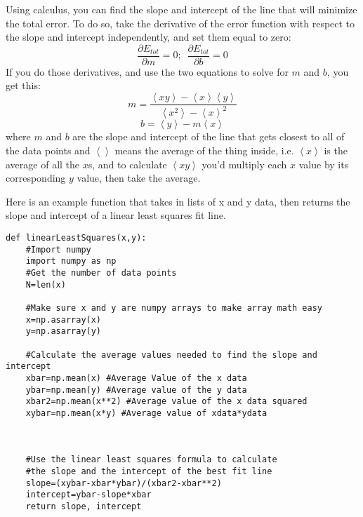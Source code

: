 Using calculus, you can find the slope and intercept of the line that will minimize the total error.  To do so, take the derivative of the error function with respect to the slope and intercept independently, and set them equal to zero:
\[\frac{\partial E_{tot}}{\partial m}=0;\,\,\,\frac{\partial E_{tot}}{\partial b}=0\]
If you do those derivatives, and use the two equations to solve for $m$ and $b$, you get this:
\[m=\frac{\left<xy\right>-\left<x\right>\left<y\right>}{\left<x^2\right>-\left<x\right>^2}\]
\[b=\left<y\right>-m\left<x\right>\]
where $m$ and $b$ are the slope and intercept of the line that gets closest to all of the data points and $\left<\right>$ means the average of the thing inside, i.e. $\left<x\right>$ is the average of all the $x$s, and to calculate $\left<xy\right>$ you'd multiply each $x$ value by its corresponding $y$ value, then take the average.

Here is an example function that takes in lists of x and y data, then returns the slope and intercept of a linear least squares fit line.
\begin{Verbatim}
def linearLeastSquares(x,y):
    #Import numpy
    import numpy as np
    #Get the number of data points
    N=len(x)

    #Make sure x and y are numpy arrays to make array math easy
    x=np.asarray(x)
    y=np.asarray(y)

    #Calculate the average values needed to find the slope and intercept
    xbar=np.mean(x) #Average Value of the x data
    ybar=np.mean(y) #Average value of the y data
    xbar2=np.mean(x**2) #Average value of the x data squared
    xybar=np.mean(x*y) #Average value of xdata*ydata



    #Use the linear least squares formula to calculate
    #the slope and the intercept of the best fit line
    slope=(xybar-xbar*ybar)/(xbar2-xbar**2)
    intercept=ybar-slope*xbar
    return slope, intercept

\end{Verbatim}



